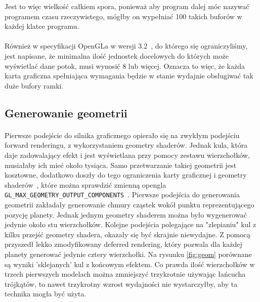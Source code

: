 Jest to więc wielkość całkiem spora, ponieważ aby program dalej móc nazywać programem czasu rzeczywistego, mógłby on wypełniać 100 takich buforów w każdej klatce programu.

\paragraph{}

Również w specyfikacji OpenGLa w wersji 3.2~\cite{ogl:spec}, do którego się ograniczyliśmy, jest napisane, że minimalna ilość jednostek docelowych do których może wyświetlać dane potok, musi wynosić 8 lub więcej. Oznacza to więc, że każda karta graficzna spełniająca wymagania będzie w stanie wydajnie obsługiwać tak duże bufory ramki.

\subsection{Generowanie geometrii}\label{sub:generowanie geometrii}
\paragraph{}

Pierwsze podejście do silnika graficznego opierało się na zwykłym podejściu forward renderingu, z wykorzystaniem geometry shaderów. Jednak kula, która daje zadowalający efekt i jest wyświetlana przy pomocy zestawu wierzchołków, musiałaby ich mieć około tysiąca. Samo przetwarzanie takiej geometrii jest kosztowne, dodatkowo doszły do tego ograniczenia karty graficznej i geometry shaderów~\cite{ogl:geom}, które można sprawdzić zmienną opengla \texttt{GL\_MAX\_GEOMETRY\_OUTPUT\_COMPONENTS}~\cite{ogl:get}. Pierwsze podejścia do generowania geometrii zakładały generowanie chmury cząstek wokół punktu reprezentującego pozycję planety. Jednak jednym geometry shaderem można było wygenerować jedynie około stu wierzchołków. Kolejne podejścia polegające na "zlepianiu" kul z kilku przejść geometry shadera, okazały się być skrajnie niewydajne. Z pomocą przyszedł lekko zmodyfikowany deferred rendering, który pozwala dla każdej planety generować jedynie cztery wierzchołki. Na rysunku \hyperref[fig:geom]{\ref*{fig:geom}} porównane są wyniki 'sklejanych' kul z końcowym efektem. Co prawda ilość wierzchołków w trzech pierwszych modelach można zmniejszyć trzykrotnie używając łańcucha trójkątów, to nawet trzykrotny wzrost wydajności nie wystarczyłby, aby ta technika mogła być użyta.

